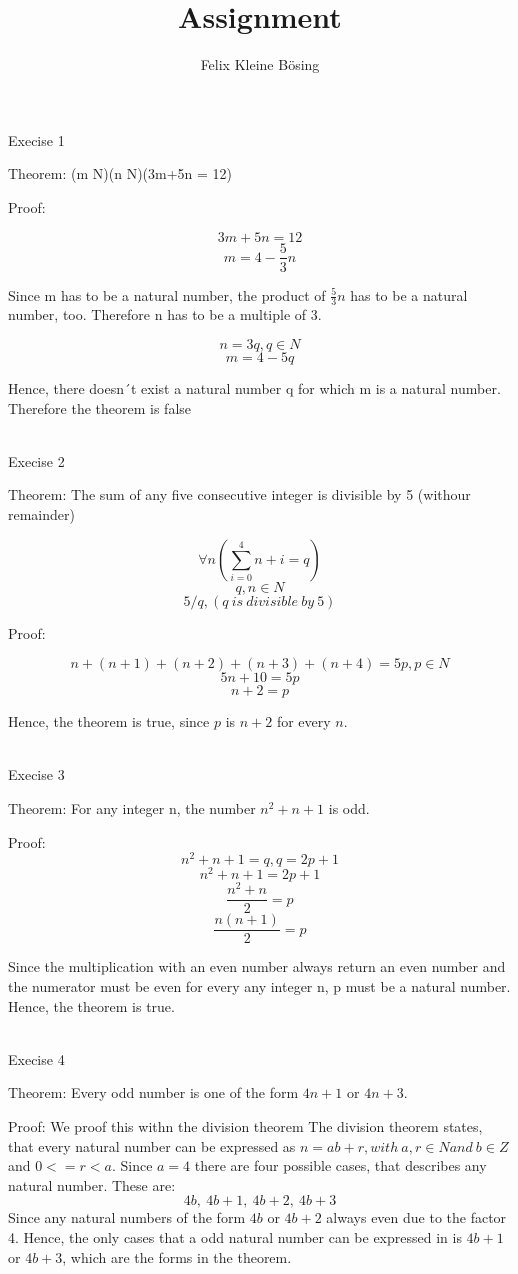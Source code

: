 \documentclass[12pt]{article}
\title{Assignment}
\author{Felix Kleine Bösing}
\begin{document}
\maketitle
Execise 1

Theorem: (\exists m \in N)(\exists n \in N)(3m+5n = 12)

Proof: 

\[3m + 5n  = 12\]
\[m = 4 - \frac{5}{3}n\]

Since m has to be a natural number, the product of \(\frac{5}{3}n\) has to be a natural number, too. Therefore n has to be a multiple of 3.

\[n = 3q, q \in N\] 
\[m = 4 - 5q\]

Hence, there doesn´t exist a natural number q for which m is a natural number. Therefore the theorem is false 


\
\\

Execise 2

Theorem: The sum of any five consecutive integer is divisible by 5 (withour remainder)

\[\forall n (\sum_{i=0}^{4} n + i  = q)\]
\[q, n \in N\]
\[5/q, (q\:is\:divisible\:by\:5) \]

Proof: 

\[n + (n+1)+(n+2)+(n+3)+(n+4)  = 5p, p \in N\]
\[5n + 10 = 5p\]
\[n + 2 = p\]

Hence, the theorem is true, since $p$ is $n+2$ for every $n$.

\
\\

Execise 3

Theorem: For any integer n, the number $n^2+n+1$ is odd.

Proof: 
\[n^2 + n + 1 = q, q = 2p+1\]
\[n^2 + n + 1 = 2p+1\]
\[\frac{n^2 + n}{2} = p\]
\[\frac{n(n + 1)}{2} = p\]

Since the multiplication with an even number always return an even number and the numerator must be even for every any integer n, p must be a natural number. Hence, the theorem is true. 

\
\\

Execise 4

Theorem: Every odd number is one of the form $4n + 1$ or $4n + 3$.

Proof: We proof this withn the division theorem
The division theorem states, that every natural number can be expressed as $n = ab + r, with\: a, r \in N and\: b \in Z$ and $0<=r<a$. Since $a = 4$ there are four possible cases, that describes any natural number. These are:
\[4b,\: 4b+1,\: 4b+2,\: 4b+3\]
Since any natural numbers of the form $4b$ or $4b+2$ always even due to the factor 4. Hence, the only cases that a odd natural number can be expressed in is $4b+1$ or $4b+3$, which are the forms in the theorem.
\end{document}
